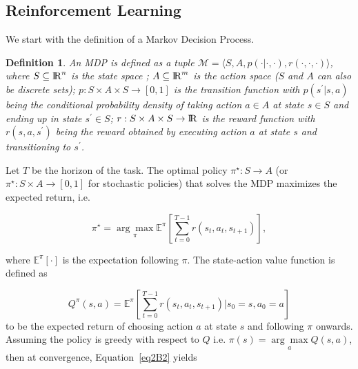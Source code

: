 \documentclass{article}
\newtheorem{definition}{Definition}
\begin{document}
\subsection{Reinforcement Learning}
\label{background_options}
We start with the definition of a Markov Decision Process.


\begin{definition}\label{def2}
An MDP is defined as a tuple $\mathcal{M} = \langle S,A,p(\cdot|\cdot,\cdot),r(\cdot,\cdot, \cdot)\rangle$, where $S\subseteq {\rm I\!R}^n$ is the state space ; $A \subseteq {\rm I\!R}^m$ is the action space ($S$ and $A$ can also be discrete sets); $p: S \times A \times S \to [0,1]$ is the transition function with $p(s^{\prime}|s,a)$ being the conditional probability density of taking action $a \in A$ at state $s \in S$ and ending up in state $s^{\prime} \in S$; $r: S \times A \times S \to {\rm I\!R}$ is the reward function with $r(s,a,s^\prime)$ being the reward obtained by executing action $a$ at state $s$ and transitioning to $s^\prime$. 
\end{definition}

Let $T$ be the horizon of the task. The optimal policy $\pi^\star: S \to A$ (or $\pi^\star: S \times A \to [0,1]$ for stochastic policies) that solves the MDP maximizes the expected return, i.e.

\begin{equation}\label{eq2B1}
\pi^\star = \underset{\pi}{\arg\max}\mathbb{E}^\pi[\sum_{t=0}^{T-1} r(s_t, a_t, s_{t+1})],
\end{equation}

\noindent where $\mathbb{E}^\pi[\cdot]$ is the expectation following $\pi$. The state-action value function is defined as 

\begin{equation}\label{eq2B2}
Q^\pi(s,a) = \mathbb{E}^\pi[\sum_{t=0}^{T-1} r(s_t, a_t, s_{t+1})|s_0=s, a_0=a]
\end{equation}
\noindent to be the expected return of choosing action $a$ at state $s$ and following $\pi$ onwards. Assuming the policy is greedy with respect to $Q$ i.e. $\pi(s) = \underset{a}{\arg\max}Q(s,a)$, then at convergence, Equation~\eqref{eq2B2} yields
\end{document}
